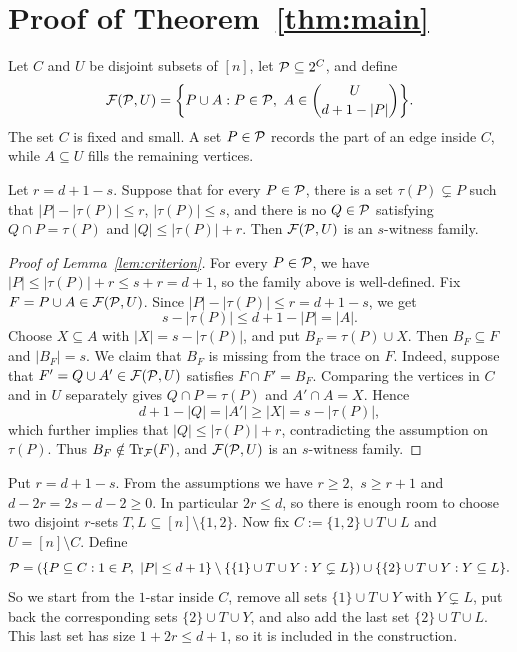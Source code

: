 \section{Proof of Theorem~\ref{thm:main}}

Let \(C\) and \(U\) be disjoint subsets of \([n]\), let \(\mathcal{P}\subseteq 2^C\), and define
\[
\cF(\cP,U)=\bigg\{P\cup A:P\in\cP,\ A\in\binom{U}{d+1-|P|}\bigg\}.
\]
The set \(C\) is fixed and small. A set \(P\in\mathcal{P}\) records the part of an edge inside \(C\), while \(A\subseteq U\) fills the remaining vertices.

\begin{lemma}\label{lem:criterion}
Let \(r=d+1-s\). Suppose that for every \(P\in\mathcal{P}\), there is a set \(\tau(P)\subsetneq P\) such that \(|P|-|\tau(P)|\le r\), \(|\tau(P)|\le s\), and there is no \(Q\in\mathcal{P}\) satisfying
\(
Q\cap P=\tau(P)\) and \(|Q|\le |\tau(P)|+r.\)
Then \(\mathcal{F}(\mathcal{P},U)\) is an \(s\)-witness family.
\end{lemma}

\begin{proof}[Proof of Lemma~\ref{lem:criterion}]
For every \(P\in\mathcal{P}\), we have \(|P|\le |\tau(P)|+r\le s+r=d+1\), so the family above is well-defined. Fix \(F=P\cup A\in\mathcal{F}(\mathcal{P},U)\). Since \(|P|-|\tau(P)|\le r=d+1-s\), we get
\[
s-|\tau(P)|\le d+1-|P|=|A|.
\]
Choose \(X\subseteq A\) with \(|X|=s-|\tau(P)|\), and put \(B_F=\tau(P)\cup X\). Then \(B_F\subseteq F\) and \(|B_F|=s\). We claim that \(B_F\) is missing from the trace on \(F\). Indeed, suppose that \(F'=Q\cup A'\in\mathcal{F}(\mathcal{P},U)\) satisfies \(F\cap F'=B_F\). Comparing the vertices in \(C\) and in \(U\) separately gives
\(Q\cap P=\tau(P)\) and \(A'\cap A=X.\)
Hence
\[
d+1-|Q|=|A'|\ge |X|=s-|\tau(P)|,
\]
which further implies that \(|Q|\le |\tau(P)|+r\), contradicting the assumption on \(\tau(P)\). Thus \(B_F\notin\operatorname{Tr}_{\mathcal{F}}(F)\), and \(\mathcal{F}(\mathcal{P},U)\) is an \(s\)-witness family.
\end{proof}

Put \(r=d+1-s\). From the assumptions we have
\(r\ge2,\) \(s\ge r+1\) and \(d-2r=2s-d-2\ge 0.\)
In particular \(2r\le d\), so there is enough room to choose two disjoint \(r\)-sets \(T,L\subseteq[n]\setminus\{1,2\}\). Now fix
\(
C:=\{1,2\}\cup T\cup L\) and \(U=[n]\setminus C.\)
Define
\[
\cP=\left(\{P\subseteq C:1\in P,\ |P|\le d+1\}\setminus\{\{1\}\cup T\cup Y:Y\subsetneq L\}\right)\cup\{\{2\}\cup T\cup Y:Y\subseteq L\}.
\]
So we start from the \(1\)-star inside \(C\), remove all sets \(\{1\}\cup T\cup Y\) with \(Y\subsetneq L\), put back the corresponding sets \(\{2\}\cup T\cup Y\), and also add the last set \(\{2\}\cup T\cup L\). This last set has size \(1+2r\le d+1\), so it is included in the construction.

